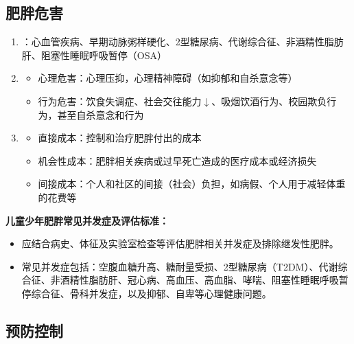 \subsection{肥胖危害}

\begin{keybox}
\begin{enumerate}[leftmargin=*]
    \item {}：心血管疾病、早期动脉粥样硬化、2型糖尿病、代谢综合征、非酒精性脂肪肝、阻塞性睡眠呼吸暂停（OSA）
    \item {}
    \begin{itemize}[leftmargin=*]
        \item 心理危害：心理压抑，心理精神障碍（如抑郁和自杀意念等）
        \item 行为危害：饮食失调症、社会交往能力$\downarrow$、吸烟饮酒行为、校园欺负行为，甚至自杀意念和行为
    \end{itemize}
    \item {}
    \begin{itemize}[leftmargin=*]
        \item 直接成本：控制和治疗肥胖付出的成本
        \item 机会性成本：肥胖相关疾病或过早死亡造成的医疗成本或经济损失
        \item 间接成本：个人和社区的间接（社会）负担，如病假、个人用于减轻体重的花费等
    \end{itemize}
\end{enumerate}

\vspace{4pt}
\textbf{儿童少年肥胖常见并发症及评估标准：}
\begin{itemize}[leftmargin=*]
    \item 应结合病史、体征及实验室检查等评估肥胖相关并发症及排除继发性肥胖。
    \item 常见并发症包括：空腹血糖升高、糖耐量受损、2型糖尿病（T2DM）、代谢综合征、非酒精性脂肪肝、冠心病、高血压、高血脂、哮喘、阻塞性睡眠呼吸暂停综合征、骨科并发症，以及抑郁、自卑等心理健康问题。
\end{itemize}
\end{keybox}

\subsection{预防控制}

